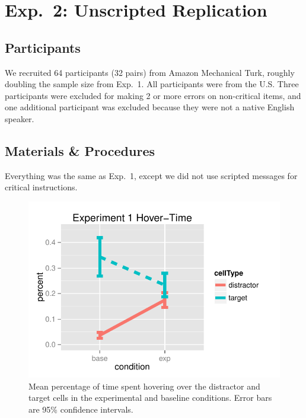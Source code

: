 \documentclass[10pt,letterpaper]{article}
\begin{document}
\section{Exp.~2: Unscripted Replication}
\label{sec:Exp2}

\subsection{Participants}

We recruited 64 participants (32 pairs) from Amazon Mechanical Turk, roughly doubling the sample size from Exp.~1. All participants were from the U.S. Three participants were excluded for making 2 or more errors on non-critical items, and one additional participant was excluded because they were not a native English speaker.

\subsection{Materials \& Procedures}

Everything was the same as Exp.~1, except we did not use scripted messages for critical instructions. 
 
 \begin{figure}[b!]
\begin{center}
\includegraphics[scale=.75]{images/exp1MouseTracking.pdf}
\caption{Mean percentage of time spent hovering over the distractor and target cells in the experimental and baseline conditions. Error bars are 95\% confidence intervals.}
\label{fig:exp1hover}
\end{center}
\end{figure}
\end{document}
